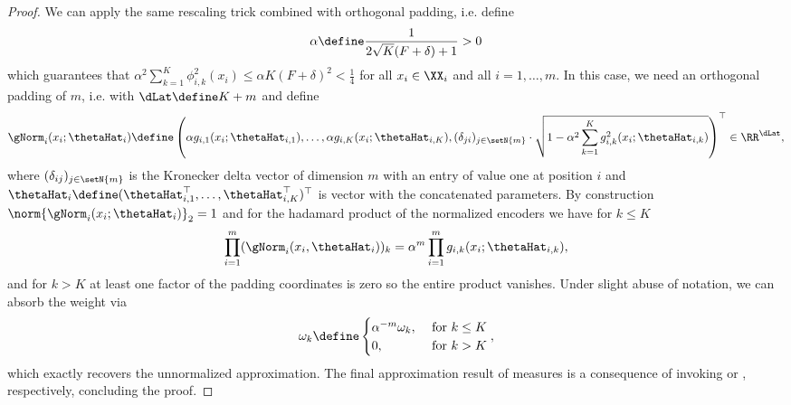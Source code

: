 \documentclass{article}
\begin{document}
\begin{proof}
  We can apply the same rescaling trick combined with
 orthogonal padding, i.e. define
 \begin{align*}
  \alpha \define \frac{1}{2 \sqrt{K} (F + \delta) + 1} > 0
 \end{align*}
 which guarantees that
 $\alpha^2 \sum_{k=1}^{K} \phi_{i,k}^2(x_i) \leq \alpha K (F+\delta)^2 < \frac{1}{4}$
 for all $x_i \in \XX_i$ and all $i=1,\ldots, m$. In this case, we need an orthogonal
 padding of $m$, i.e. with $\dLat \define K + m$ and define
 \begin{align*}
  \gNorm_i(x_i;\thetaHat_i) \define
  \left(\alpha g_{i,1}(x_i; \thetaHat_{i,1}), \ldots, \alpha
  g_{i,K}(x_i;\thetaHat_{i,K}), (\delta_{ji})_{j\in \setN{m}} \cdot
  \sqrt{1- \alpha^2 \sum_{k=1}^K g^2_{i,k}(x_i;\thetaHat_{i,k})}\right)^\top \in \RR^{\dLat},
 \end{align*}
 where $(\delta_{ij})_{j\in \setN{m}}$ is the Kronecker delta vector of dimension
 $m$ with an entry of value one at position $i$ and
 $\thetaHat_i \define (\thetaHat^\top_{i,1}, \ldots, \thetaHat^\top_{i,K})^\top$
 is vector with the concatenated parameters.
 By construction $\norm{\gNorm_{i}(x_i;\thetaHat_i)}_2 = 1$
 and for the hadamard product of the normalized encoders we have
 for $k\leq K$
 \begin{align*}
  \prod_{i=1}^{m} (\gNorm_{i}(x_i,\thetaHat_{i}))_k
  = \alpha^m \prod_{i=1}^{m} g_{i,k}(x_i; \thetaHat_{i,k}),
 \end{align*}
 and for $k > K$ at least one factor of the padding coordinates is zero so
 the entire product vanishes. Under slight abuse of notation, we can absorb
 the weight via
 \begin{align*}
  \omega_k \define \begin{cases}
                    \alpha^{-m} \omega_k, & \text{ for } k\leq K \\
                    0,                    & \text{ for } k> K
                   \end{cases},
 \end{align*}
 which exactly recovers the unnormalized approximation. The final approximation
 result of measures is a consequence of invoking 
 or , respectively,
 concluding the proof.
\end{proof}
\end{document}
